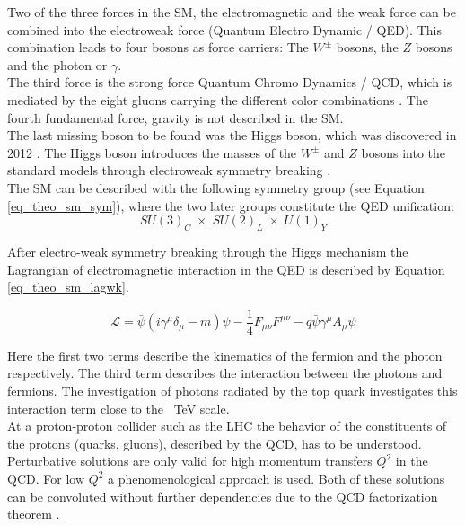 Two of the three forces in the SM, the electromagnetic and the weak force can be combined into the electroweak force (Quantum Electro Dynamic / QED). This combination leads to four bosons as force carriers: The $W^\pm$ bosons, the $Z$ bosons and the photon or $\gamma$.  \\
The third force is the strong force {Quantum Chromo Dynamics / QCD}, which is mediated by the eight gluons carrying the different color combinations \cite{Politzer:1974fr}. The fourth fundamental force, gravity is not described in the SM.\\ 
The last missing boson to be found was the Higgs boson, which was discovered in 2012 \cite{Aad:2012tfa} \cite{Chatrchyan:2012ufa}. The Higgs boson introduces the masses of the $W^\pm$ and $Z$ bosons into the standard models through electroweak symmetry breaking \cite{Salam:1968rm} \cite{Weinberg:1967tq} \cite{Glashow:1961tr}. \\
The SM can be described with the following symmetry group (see Equation \ref{eq_theo_sm_sym}), where the two later groups constitute the QED unification:
\begin{equation}
SU(3)_C \; \times \; SU(2)_L \; \times \; U(1)_Y
\label{eq_theo_sm_sym}
\end{equation}

After electro-weak symmetry breaking through the Higgs mechanism the Lagrangian of electromagnetic interaction in the QED is described by Equation \ref{eq_theo_sm_lagwk}.

\begin{equation}
\mathcal{L} = \bar{\psi} (i \gamma^\mu \delta_\mu - m) \psi - \frac{1}{4} F_{\mu \nu} F^{\mu \nu} - q \bar{\psi} \gamma^\mu A_\mu \psi
\label{eq_theo_sm_lagwk}
\end{equation}

Here the first two terms describe the kinematics of the fermion and the photon respectively. The third term describes the interaction between the photons and fermions. The investigation of photons radiated by the top quark investigates this interaction term close to the \SI{}{\tera \electronvolt} scale.\\
At a proton-proton collider such as the LHC the behavior of the constituents of the protons (quarks, gluons), described by the QCD, has to be understood. Perturbative solutions are only valid for high momentum transfers $Q^2$ in the QCD. For low $Q^2$ a phenomenological approach is used. Both of these solutions can be convoluted without further dependencies due to the QCD factorization theorem \cite{Collins:1987pm}.\\

